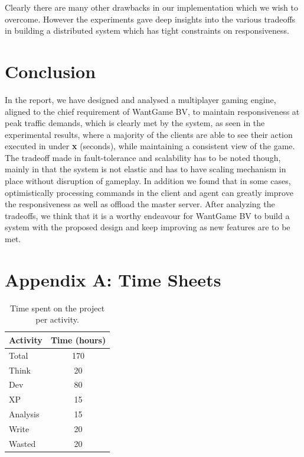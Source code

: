 \documentclass[a4paper]{IEEEtran}
\begin{document}
  Clearly there are many other drawbacks in our implementation which we wish to overcome. However the experiments gave deep insights into the various tradeoffs in building a distributed system which has tight constraints on responsiveness.
  
  \section{Conclusion} \label{conclusion}
  
  In the report, we have designed and analysed a multiplayer gaming engine, aligned to the chief requirement of WantGame BV, to maintain responsiveness at peak traffic demands, which is clearly met by the system, as seen in the experimental results, where a majority of the clients are able to see their action executed in under \textbf{x} (seconds), while maintaining a consistent view of the game. The tradeoff made in fault-tolerance and scalability has to be noted though, mainly in that the system is not elastic and has to have scaling mechanism in place without disruption of gameplay. In addition we found that in some cases, optimistically processing commands in the client and agent can greatly improve the responsiveness as well as offload the master server. After analyzing the tradeoffs, we think that it is a worthy endeavour for WantGame BV to build a system with the proposed design and keep improving as new features are to be met.
  
  
  
  
  \section*{Appendix A: Time Sheets}
  
  \begin{table}[htbp]
    \centering
    \caption{Time spent on the project per activity.}
    \begin{tabular}{| l | c |}
      \hline
      Activity & Time (hours) \\
      \hline
      Total & 170 \\
      Think & 20 \\
      Dev & 80 \\
      XP & 15 \\
      Analysis & 15 \\
      Write & 20 \\
      Wasted & 20 \\
      \hline
    \end{tabular}
  \end{table}
\end{document}
